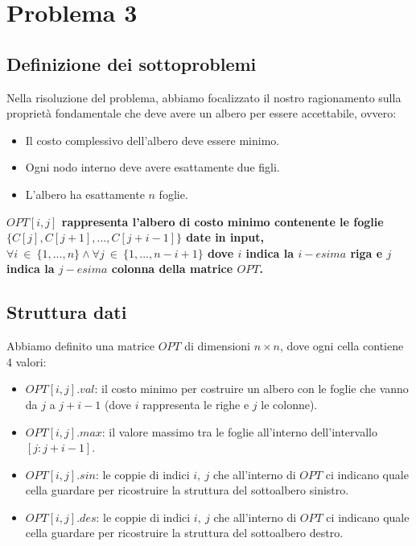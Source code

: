 \section{Problema 3}

\subsection{Definizione dei sottoproblemi}

Nella risoluzione del problema, abbiamo focalizzato il nostro ragionamento sulla proprietà fondamentale che deve avere un albero per
essere accettabile, ovvero:
\begin{itemize}
	\item Il costo complessivo dell'albero deve essere minimo.
	\item Ogni nodo interno deve avere esattamente due figli.
	\item L'albero ha  esattamente $n$ foglie.
\end{itemize}

\begin{center}
	\textbf{$OPT[i, j]$ rappresenta l'albero di costo minimo contenente le foglie $\{C[j], C[j + 1], ..., C[j + i - 1]\}$ date in input, 
		$\forall i\ \in\ \{1, ..., n\} \land \forall j\ \in\ \{1, ..., n - i + 1\}$ dove $i$ indica la $i-esima$ riga e $j$ indica la $j-esima$ colonna della matrice $OPT$.}
\end{center}

\subsection{Struttura dati}

Abbiamo definito una matrice $OPT$ di dimensioni $n \times n$, dove ogni cella contiene 4 valori:

\begin{itemize}
	\item $OPT[i, j].val$: il costo minimo per costruire un albero con le foglie che vanno da $j$ a $j + i - 1$ (dove $i$ rappresenta le righe e $j$ le colonne).
	\item $OPT[i, j].max$: il valore massimo tra le foglie all'interno dell'intervallo $[j: j + i - 1]$.
	\item $OPT[i, j].sin$: le coppie di indici $i,\ j$ che all'interno di $OPT$ ci indicano quale cella guardare per ricostruire la struttura del sottoalbero sinistro.
	\item $OPT[i, j].des$: le coppie di indici $i,\ j$ che all'interno di $OPT$ ci indicano quale cella guardare per ricostruire la struttura del sottoalbero destro.
\end{itemize}

